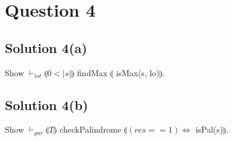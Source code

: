 \documentclass[12pt]{article}
\newcommand\abs[1]{\left|#1\right|}
\begin{document}
\section*{Question 4}
\subsection*{Solution 4(a)}
Show $\vdash_{tot} \limg 0 < \abs{s} \rimg$ findMax $\limg $ isMax(s, lo)$\rimg$. \\ 

\newpage
\subsection*{Solution 4(b)}
Show $\vdash_{par} \limg T \rimg$ checkPalindrome $\limg (res==1)\iff$ isPal(s)$\rimg$. \\ 

\end{document}

